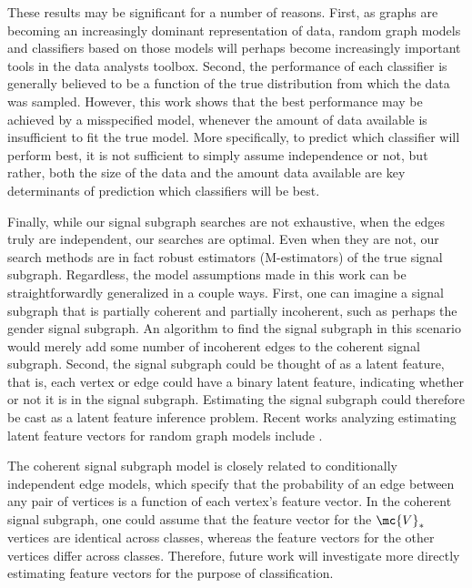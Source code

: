 These results may be significant for a number of reasons.  First, as graphs are becoming an increasingly dominant representation of data, random graph models and classifiers based on those models will perhaps become increasingly important tools in the data analysts toolbox.  Second, the performance of each classifier is generally believed to be a function of the true distribution from which the data was sampled.  However, this work shows that the best performance may be achieved by a misspecified model, whenever the amount of data available is insufficient to fit the true model.  More specifically, to predict which classifier will perform best, it is not sufficient to simply assume independence or not, but rather, both the size of the data and the amount data available are key determinants of prediction which classifiers will be best.  

Finally, while our signal subgraph searches are not exhaustive, when the edges truly are independent, our searches are optimal.  Even when they are not, our search methods are in fact robust estimators (M-estimators) of the true signal subgraph.  Regardless, the model assumptions made in this work can be straightforwardly generalized in a couple ways.  First, one can imagine a signal subgraph that is partially coherent and partially incoherent, such as perhaps the gender signal subgraph.  An algorithm to find the signal subgraph in this scenario would merely add some number of incoherent edges to the coherent signal subgraph.  Second, the signal subgraph could be thought of as a latent feature, that is, each vertex or edge could have a binary latent feature, indicating whether or not it is in the signal subgraph.  Estimating the signal subgraph could therefore be cast as a latent feature inference problem.  Recent works analyzing estimating latent feature vectors for random graph models include \cite{???}.  

The coherent signal subgraph model is closely related to conditionally independent edge models, which specify that the probability of an edge between any pair of vertices is a function of each vertex's feature vector.  In the coherent signal subgraph, one could assume that the feature vector for the $\mc{V}_*$ vertices are identical across classes, whereas the feature vectors for the other vertices differ across classes.  Therefore, future work will investigate more directly estimating feature vectors for the purpose of classification.






